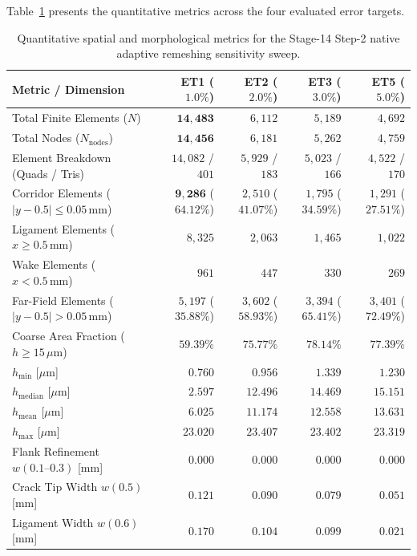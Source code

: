 Table~\ref{tab:step2_error_target_sensitivity} presents the quantitative metrics across the four evaluated error targets.

\begin{table}[htbp]
\centering
\small
\caption{Quantitative spatial and morphological metrics for the Stage-14 Step-2 native adaptive remeshing sensitivity sweep.}
\label{tab:step2_error_target_sensitivity}
\begin{tabular}{lrrrr}
\toprule
Metric / Dimension & ET1 ($1.0\%$) & ET2 ($2.0\%$) & ET3 ($3.0\%$) & ET5 ($5.0\%$) \\
\midrule
Total Finite Elements ($N$) & $\mathbf{14{,}483}$ & $6{,}112$ & $5{,}189$ & $4{,}692$ \\
Total Nodes ($N_{\mathrm{nodes}}$) & $\mathbf{14{,}456}$ & $6{,}181$ & $5{,}262$ & $4{,}759$ \\
Element Breakdown (Quads / Tris) & $14{,}082$ / $401$ & $5{,}929$ / $183$ & $5{,}023$ / $166$ & $4{,}522$ / $170$ \\
Corridor Elements ($|y-0.5| \le 0.05\,\mathrm{mm}$) & $\mathbf{9{,}286}$ ($\mathbf{64.12\%}$) & $2{,}510$ ($41.07\%$) & $1{,}795$ ($34.59\%$) & $1{,}291$ ($27.51\%$) \\
Ligament Elements ($x \ge 0.5\,\mathrm{mm}$) & $8{,}325$ & $2{,}063$ & $1{,}465$ & $1{,}022$ \\
Wake Elements ($x < 0.5\,\mathrm{mm}$) & $961$ & $447$ & $330$ & $269$ \\
Far-Field Elements ($|y-0.5| > 0.05\,\mathrm{mm}$) & $5{,}197$ ($35.88\%$) & $3{,}602$ ($58.93\%$) & $3{,}394$ ($65.41\%$) & $3{,}401$ ($72.49\%$) \\
Coarse Area Fraction ($h \ge 15\,\mu\mathrm{m}$) & $59.39\%$ & $75.77\%$ & $78.14\%$ & $77.39\%$ \\
$h_{\min}$ [$\mu\mathrm{m}$] & $0.760$ & $0.956$ & $1.339$ & $1.230$ \\
$h_{\mathrm{median}}$ [$\mu\mathrm{m}$] & $2.597$ & $12.496$ & $14.469$ & $15.151$ \\
$h_{\mathrm{mean}}$ [$\mu\mathrm{m}$] & $6.025$ & $11.174$ & $12.558$ & $13.631$ \\
$h_{\max}$ [$\mu\mathrm{m}$] & $23.020$ & $23.407$ & $23.402$ & $23.319$ \\
Flank Refinement $w(0.1\text{--}0.3)$ [mm] & $\mathbf{0.000}$ & $\mathbf{0.000}$ & $\mathbf{0.000}$ & $\mathbf{0.000}$ \\
Crack Tip Width $w(0.5)$ [mm] & $0.121$ & $0.090$ & $0.079$ & $0.051$ \\
Ligament Width $w(0.6)$ [mm] & $0.170$ & $0.104$ & $0.099$ & $0.021$ \\

\end{tabular}
\end{table}
